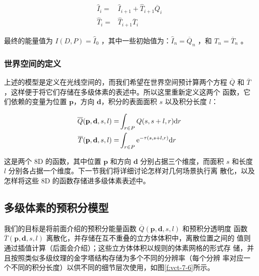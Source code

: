 \begin{equation}
	\begin{aligned}
		\hat{I}_i=& \hat{I}_{i+1}+\hat {T}_{i+1}\overline{Q}_i\\
		\hat{T}_i=&\hat{T}_{i+1}\overline{T}_i
	\end{aligned}
\end{equation}

\noindent 最终的能量值为 $I(D,P) = \hat{I}_0$ ，其中一些初始值为：$\hat{I}_n = \overline{Q}_n$ ，和 $\hat{T}_n = \overline{T}_n$ 。



\subsubsection{世界空间的定义}
上述的模型是定义在光线空间的，而我们希望在世界空间预计算两个方程 $\overline{Q}$ 和 $\overline{T}$，这样便于将它们存储在多级体素的表述中。所以这里重新定义这两个 函数，它们依赖的变量为位置 $\mathbf{p}$，方向 $\mathbf{d}$，积分的表面面积 $s$ 以及积分长度 $l$：

\begin{equation}
\begin{aligned}
	\overline{Q}(\mathbf{p},\mathbf{d},s,l)=&\int_{r\in P}Q(s,s+l,r){\rm d}r\\
	\overline{T}(\mathbf{p},\mathbf{d},s,l)=&\int_{r\in P}{\rm e}^{-\tau (s,s+l,r)}{\rm d}r
\end{aligned}
\end{equation}

这是两个 8D 的函数，其中位置 $\mathbf{p}$ 和方向 $\mathbf{d}$ 分别占据三个维度，而面积 $s$ 和长度 $l$ 分别各占据一个维度。下一节我们将详细讨论怎样对几何场景执行离 散化，以及怎样将这些 8D 的函数存储进多级体素表述中。



\subsection{多级体素的预积分模型}\label{sec:vct-mip-pre-intergation}
我们的目标是将前面介绍的预积分能量函数 $\overline{Q}(\mathbf{p},\mathbf{d},s,l)$ 和预积分透明度 函数 $\overline{T}(\mathbf{p},\mathbf{d},s,l)$ 离散化，并存储在互不重叠的立方体体积中，离散位置之间的 值则通过插值计算（后面会介绍）；这些立方体体积以规则的体素网格的形式存 储，并且按照类似多级纹理的金字塔结构存储为多个不同的分辨率（每个分辨 率对应一个不同的积分长度）以供不同的细节层次使用，如图\ref{f:vct-7-6}所示。

